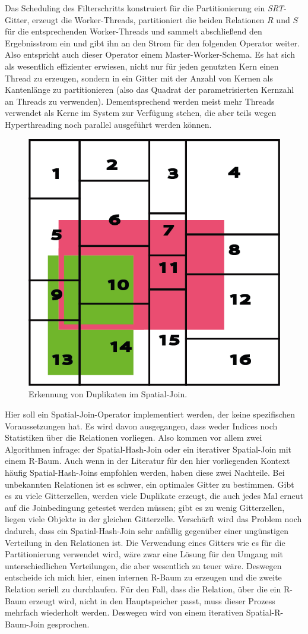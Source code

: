 \documentclass[a4paper,12pt,twoside]{article}
\newcommand{\Fb}[1]{\textit{#1}} %
\begin{document}
Das Scheduling des Filterschritts konstruiert für die Partitionierung ein \Fb{SRT}-Gitter, erzeugt die Worker-Threads, partitioniert die beiden Relationen $R$ und $S$ für die entsprechenden Worker-Threads und sammelt abschließend den Ergebnisstrom ein und gibt ihn an den Strom für den folgenden Operator weiter. Also entspricht auch dieser Operator einem Master-Worker-Schema. Es hat sich als wesentlich effizienter erwiesen, nicht nur für jeden genutzten Kern einen Thread zu erzeugen, sondern in ein Gitter mit der Anzahl von Kernen als Kantenlänge zu partitionieren (also das Quadrat der parametrisierten Kernzahl an Threads zu verwenden). Dementsprechend werden meist mehr Threads verwendet als Kerne im System zur Verfügung stehen, die aber teils wegen Hyperthreading noch parallel ausgeführt werden können.

\begin{figure}
	\centering
	\includegraphics[width=0.4\linewidth]{Bilder/duplikat.png}
	\caption{Erkennung von Duplikaten im Spatial-Join.}
	\label{img:sjDup}
\end{figure}

Hier soll ein Spatial-Join-Operator implementiert werden, der keine spezifischen Voraussetzungen hat. Es wird davon ausgegangen, dass weder Indices noch Statistiken über die Relationen vorliegen. Also kommen vor allem zwei Algorithmen infrage: der Spatial-Hash-Join oder ein iterativer Spatial-Join mit einem R-Baum. Auch wenn in der Literatur für den hier vorliegenden Kontext häufig Spatial-Hash-Joins empfohlen werden, haben diese zwei Nachteile. Bei unbekannten Relationen ist es schwer, ein optimales Gitter zu bestimmen. Gibt es zu viele Gitterzellen, werden viele Duplikate erzeugt, die auch jedes Mal erneut auf die Joinbedingung getestet werden müssen;  gibt es zu wenig Gitterzellen, liegen viele Objekte in der gleichen Gitterzelle. Verschärft wird das Problem noch dadurch, dass ein Spatial-Hash-Join sehr anfällig gegenüber einer ungünstigen Verteilung in den Relationen ist. Die Verwendung eines Gitters wie es für die Partitionierung verwendet wird, wäre zwar eine Lösung für den Umgang mit unterschiedlichen Verteilungen, die aber wesentlich zu teuer wäre. Deswegen entscheide ich mich hier, einen internen R-Baum zu erzeugen und die zweite Relation seriell zu durchlaufen. Für den Fall, dass die Relation, über die ein R-Baum erzeugt wird, nicht in den Hauptspeicher passt, muss dieser Prozess mehrfach wiederholt werden. Deswegen wird von einem iterativen Spatial-R-Baum-Join gesprochen.
\end{document}
